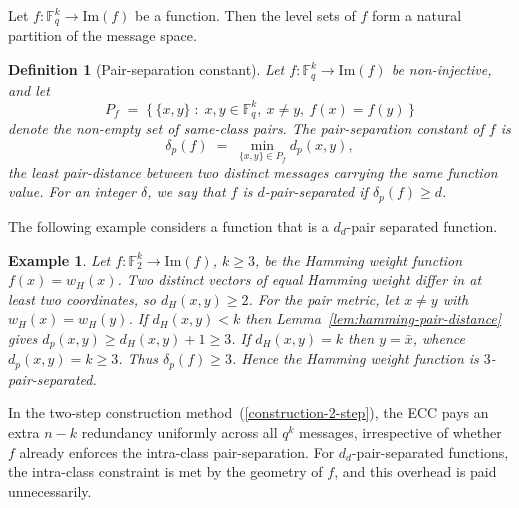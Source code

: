 \documentclass[11pt,draftclsnofoot,journal,onecolumn]{IEEEtran}
\newtheorem{definition}{Definition}
\newtheorem{example}{Example}
\begin{document}
    Let $f : \mathbb{F}_q^k \to \mathrm{Im}(f)$ be a function. Then the level sets of $f$ form a natural partition of the message space.

    \begin{definition}[Pair-separation constant]
    \label{def:pair-sep-constant}
    Let $f:\mathbb{F}_q^{k}\to\mathrm{Im}(f)$ be non-injective, and let
    \[
        P_f\;=\;\bigl\{\,\{x,y\}\;:\;x,y\in\mathbb{F}_q^{k},\ x\neq y,\ f(x)=f(y)\,\bigr\}
    \]
    denote the non-empty set of same-class pairs. The \emph{pair-separation constant} of $f$ is
    \[
        \delta_{p}(f)\;=\;\min_{\{x,y\}\in P_f} d_p(x,y),
    \]
    the least pair-distance between two distinct messages carrying the same
    function value. For an integer $\delta$, we say that $f$ is \emph{$d$-pair-separated} if $\delta_{p}(f)\ge d$.
    \end{definition}



    The following example considers a function that is a $d_d$-pair separated function.
    \begin{example}
    Let $f:\mathbb{F}_2^{k}\to\mathrm{Im}(f)$, $k\ge3$, be the Hamming weight function $f(x)=w_H(x)$. Two distinct vectors of equal Hamming weight differ in at least two coordinates, so $d_H(x,y) \ge 2$. For the pair metric, let $x \ne y$ with $w_H(x)=w_H(y)$. If $d_H(x,y)<k$ then Lemma~\ref{lem:hamming-pair-distance} gives $d_p(x,y)\ge d_H(x,y)+1\ge3$. If $d_H(x,y)=k$ then $y=\bar x$, whence $d_p(x,y)=k\ge3$. Thus $\delta_{p}(f)\ge3$. Hence the Hamming weight function is $3$-pair-separated.
    \end{example}
    
    In the two-step construction method~(\ref{construction-2-step}), the ECC pays an extra $n - k$ redundancy uniformly across all $q^k$ messages, irrespective of whether $f$ already enforces the intra-class pair-separation. For $d_d$-pair-separated functions, the intra-class constraint is met by the geometry of $f$, and this overhead is paid unnecessarily.\\
\end{document}
